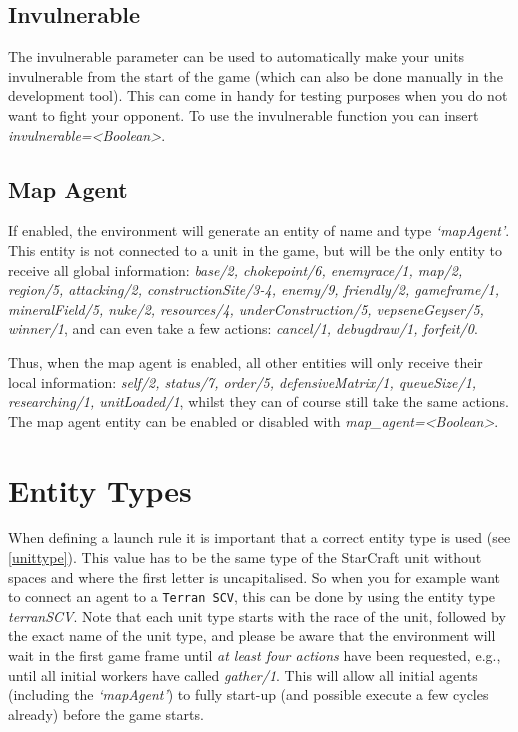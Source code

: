 \subsection{Invulnerable}
\label{invulnerable}
The invulnerable parameter can be used to automatically make your units invulnerable from the start of the game (which can also be done manually in the development tool). This can come in handy for testing purposes when you do not want to fight your opponent. To use the invulnerable function you can insert \textit{invulnerable=<Boolean>}.

\subsection{Map Agent}
\label{map agent}
If enabled, the environment will generate an entity of name and type \textit{`mapAgent'}. This entity is not connected to a unit in the game, but will be the only entity to receive all global information: \textit{base/2, chokepoint/6, enemyrace/1, map/2, region/5, attacking/2, constructionSite/3-4, enemy/9, friendly/2, gameframe/1, mineralField/5, nuke/2, resources/4, underConstruction/5, vepseneGeyser/5, winner/1}, and can even take a few actions: \textit{cancel/1, debugdraw/1, forfeit/0}. 

Thus, when the map agent is enabled, all other entities will only receive their local information: \textit{self/2, status/7, order/5, defensiveMatrix/1, queueSize/1, researching/1, unitLoaded/1}, whilst they can of course still take the same actions. The map agent entity can be enabled or disabled with \textit{map\_agent=<Boolean>}.

\newpage

\section{Entity Types}
When defining a launch rule it is important that a correct entity type is used (see \ref{unittype}). This value has to be the same type of the StarCraft unit without spaces and where the first letter is uncapitalised. So when you for example want to connect an agent to a \texttt{Terran SCV}, this can be done by using the entity type \textit{terranSCV}. Note that each unit type starts with the race of the unit, followed by the exact name of the unit type, and please be aware that the environment will wait in the first game frame until \textit{at least four actions} have been requested, e.g., until all initial workers have called \textit{gather/1}. This will allow all initial agents (including the \textit{`mapAgent'}) to fully start-up (and possible execute a few cycles already) before the game starts.

